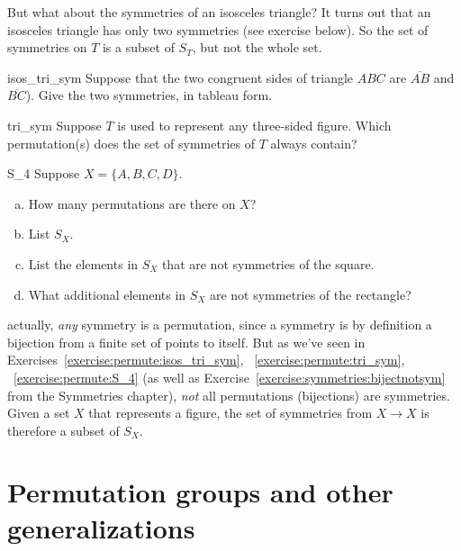 But what about the symmetries of an isosceles triangle? It turns out that an isosceles triangle has only two symmetries (see exercise below). 
So  the set of symmetries on $T$ is a subset of $S_T$, but not the whole set.

\begin{exercise}{isos_tri_sym}
Suppose that the two congruent sides of triangle $ABC$ are $\overline{AB}$ and $\overline{BC}$). Give the two symmetries, in tableau form.
\end{exercise}

\begin{exercise}{tri_sym}
Suppose $T$ is used to represent any three-sided figure.  
Which permutation(s) does the set of symmetries of $T$ always contain?
\end{exercise}

\begin{exercise}{S_4}
Suppose $X = \{A, B, C, D\}$.
\begin{enumerate}[(a)]
\item
How many permutations are there on $X$?
\item
List $S_X$.
\item
List the elements in $S_X$ that are not symmetries of the square.
\item
What additional elements in $S_X$ are not symmetries of the rectangle?
\end{enumerate}
\end{exercise}

actually, \emph{any} symmetry is a permutation, since a symmetry is by definition a bijection from a finite set of points to itself.  But as we've seen in Exercises~\ref{exercise:permute:isos_tri_sym}, ~\ref{exercise:permute:tri_sym}, ~\ref{exercise:permute:S_4} (as well as Exercise~\ref{exercise:symmetries:bijectnotsym} from the Symmetries chapter), \emph{not} all permutations (bijections) are symmetries.  Given a set $X$ that represents a figure, the set of symmetries from $X \to X$ is therefore a subset of $S_X$.



\section{Permutation groups and other generalizations}

